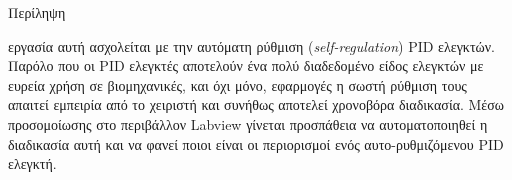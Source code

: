 \pagestyle{plain}
\begin{center}
{\LARGE Περίληψη}\\[1cm]
\end{center}


\lettrine[findent=2pt]{}{ } εργασία αυτή ασχολείται με την αυτόματη ρύθμιση (\emph{self-regulation}) PID ελεγκτών. Παρόλο που οι PID ελεγκτές αποτελούν ένα πολύ διαδεδομένο είδος ελεγκτών με ευρεία χρήση σε βιομηχανικές, και όχι μόνο, εφαρμογές η σωστή ρύθμιση τους απαιτεί εμπειρία από το χειριστή και συνήθως αποτελεί χρονοβόρα διαδικασία. Μέσω προσομοίωσης στο περιβάλλον Labview γίνεται προσπάθεια να αυτοματοποιηθεί η διαδικασία αυτή και να φανεί ποιοι είναι οι περιορισμοί ενός αυτο-ρυθμιζόμενου PID ελεγκτή.